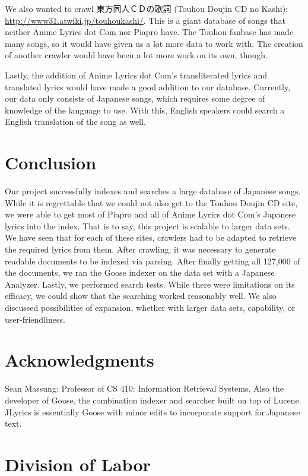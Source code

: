 \documentclass{acm} %
\begin{document}
\begin{CJK}{UTF8}{zhsong}
We also wanted to crawl 東方同人ＣＤの歌詞 (Touhou Doujin CD no Kashi): \url{http://www31.atwiki.jp/touhoukashi/}. This is a giant database of songs that neither Anime Lyrics dot Com nor Piapro have. The Touhou fanbase has made many songs, so it would have given us a lot more data to work with. The creation of another crawler would have been a lot more work on its own, though.

Lastly, the addition of Anime Lyrics dot Com's transliterated lyrics and translated lyrics would have made a good addition to our database. Currently, our data only consists of Japanese songs, which requires some degree of knowledge of the language to use. With this, English speakers could search a English translation of the song as well.

\section{Conclusion}

Our project successfully indexes and searches a large database of Japanese songs. While it is regrettable that we could not also get to the Touhou Doujin CD site, we were able to get most of Piapro and all of Anime Lyrics dot Com's Japanese lyrics into the index. That is to say, this project is scalable to larger data sets. We have seen that for each of these sites, crawlers had to be adapted to retrieve the required lyrics from them. After crawling, it was necessary to generate readable documents to be indexed via parsing. After finally getting all 127,000 of the documents, we ran the Goose indexer on the data set with a Japanese Analyzer. Lastly, we performed search tests. While there were limitations on its efficacy, we could show that the searching worked reasonably well. We also discussed possibilities of expansion, whether with larger data sets, capability, or user-friendliness.

\section*{Acknowledgments}

Sean Massung: Professor of CS 410: Information Retrieval Systems. Also the developer of Goose, the combination indexer and searcher built on top of Lucene. JLyrics is essentially Goose with minor edits to incorporate support for Japanese text.

\appendix

\section{Division of Labor}


\end{CJK}
\end{document}
